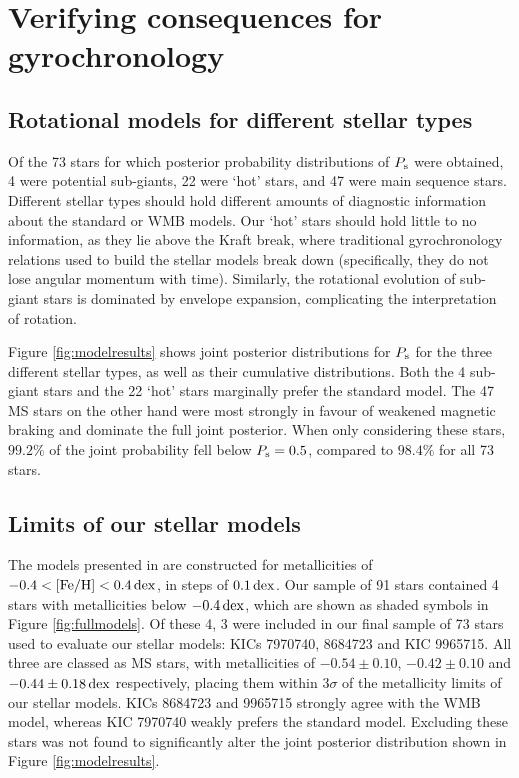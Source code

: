 \documentclass[12pt]{article}
\begin{document}
\section{Verifying consequences for gyrochronology}
\subsection{Rotational models for different stellar types}
Of the 73 stars for which posterior probability distributions of $P_{\rm s}$ were obtained, 4 were potential sub-giants, 22 were `hot' stars, and 47 were main sequence stars. Different stellar types should hold different amounts of diagnostic information about the standard or WMB models. Our `hot' stars should hold little to no information, as they lie above the Kraft break, where traditional gyrochronology relations used to build the stellar models break down (specifically, they do not lose angular momentum with time). Similarly, the rotational evolution of sub-giant stars is dominated by envelope expansion, complicating the interpretation of rotation. 

Figure \ref{fig:modelresults} shows joint posterior distributions for $P_{\rm s}$ for the three different stellar types, as well as their cumulative distributions. Both the  4 sub-giant stars and the 22 `hot' stars marginally prefer the standard model. The 47 MS stars on the other hand were most strongly in favour of weakened magnetic braking and dominate the full joint posterior. When only considering these stars, $99.2\%$ of the joint probability fell below $P_{\rm{s}} = 0.5$, compared to $98.4\%$ for all 73 stars.

\subsection{Limits of our stellar models}\label{ssec:limits}
The models presented in \cite{vansaders+2019} are constructed for metallicities of $-0.4 < \rm{[Fe/H]} < 0.4\, \rm{dex}$, in steps of $0.1\, \rm {dex}$. Our sample of 91 stars contained 4 stars with metallicities below $-0.4\, \rm{dex}$, which are shown as shaded symbols in Figure \ref{fig:fullmodels}. Of these 4, 3 were included in our final sample of 73 stars used to evaluate our stellar models: KICs 7970740, 8684723 and KIC 9965715. All three are classed as MS stars, with metallicities of $-0.54 \pm 0.10$, $-0.42 \pm 0.10$ and $-0.44 \pm 0.18\, \rm {dex}$ respectively, placing them within $3\sigma$ of the metallicity limits of our stellar models. KICs 8684723 and 9965715 strongly agree with the WMB model, whereas KIC 7970740 weakly prefers the standard model. Excluding these stars was not found to significantly alter the joint posterior distribution shown in Figure \ref{fig:modelresults}.
\end{document}
